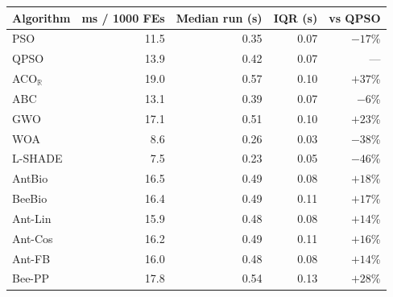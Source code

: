 \begin{tabular}{lrrrr}
\toprule
Algorithm & ms / 1000 FEs & Median run (s) & IQR (s) & vs QPSO \\
\midrule
PSO & 11.5 & 0.35 & 0.07 & $-17$\% \\
QPSO & 13.9 & 0.42 & 0.07 & --- \\
ACO$_\mathbb{R}$ & 19.0 & 0.57 & 0.10 & $+37$\% \\
ABC & 13.1 & 0.39 & 0.07 & $-6$\% \\
GWO & 17.1 & 0.51 & 0.10 & $+23$\% \\
WOA & 8.6 & 0.26 & 0.03 & $-38$\% \\
L-SHADE & 7.5 & 0.23 & 0.05 & $-46$\% \\
AntBio & 16.5 & 0.49 & 0.08 & $+18$\% \\
BeeBio & 16.4 & 0.49 & 0.11 & $+17$\% \\
Ant-Lin & 15.9 & 0.48 & 0.08 & $+14$\% \\
Ant-Cos & 16.2 & 0.49 & 0.11 & $+16$\% \\
Ant-FB & 16.0 & 0.48 & 0.08 & $+14$\% \\
Bee-PP & 17.8 & 0.54 & 0.13 & $+28$\% \\
\bottomrule
\end{tabular}
